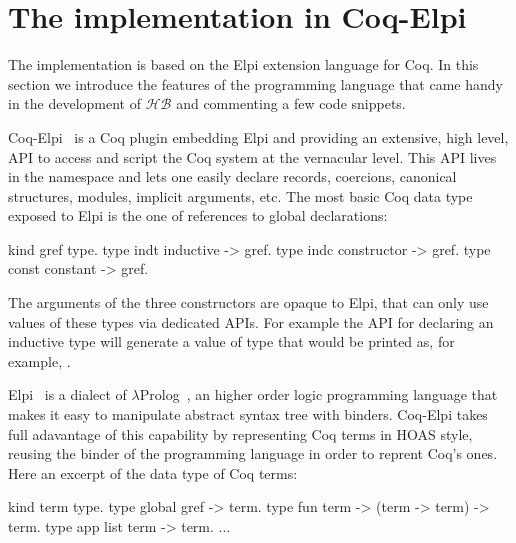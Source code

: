\documentclass[a4paper,UKenglish,cleveref, autoref]{lipics-v2019}
\newcommand{\HB}{\ensuremath{\mathcal{HB}}}
\begin{document}
\section{The implementation in Coq-Elpi}\label{sec:implementation}

The implementation is based on the Elpi
extension language for Coq. In this section we introduce the features of the
programming language that came handy in the development of \HB{} and
commenting a few code snippets.

Coq-Elpi~\cite{CoqElpi} is a Coq plugin embedding
Elpi and providing an
extensive, high level, API to access and script the Coq system at the
vernacular level.
This API lives in the  namespace and lets one easily declare
records, coercions, canonical structures, modules, implicit arguments, etc.
The most basic Coq data type exposed to Elpi is the one of references to global
declarations:

\begin{elpicode}
kind gref  type.
type indt  inductive -> gref.    %
type indc  constructor -> gref.  %
type const constant -> gref.     %
\end{elpicode}

The arguments of the three constructors are opaque to Elpi, that can only use
values of these types via dedicated APIs. For example the API for declaring
an inductive type will generate a value of type  that
would be printed as, for example, .

Elpi~\cite{DBLP:conf/lpar/DunchevGCT15} is a dialect
of $\lambda$Prolog~\cite{Miller:2012:PHL:2331097}, an higher order
logic programming language that makes it easy to manipulate abstract syntax
tree with binders. Coq-Elpi takes full adavantage of this capability by
representing Coq terms in HOAS style, reusing the binder of the programming
language in order to reprent Coq's ones. Here an excerpt of the data
type of Coq terms:

\begin{elpicode}
kind term type.
type global gref -> term.                    %
type fun    term -> (term -> term) -> term.  %
type app    list term -> term.               %
... %
\end{elpicode}
\end{document}
